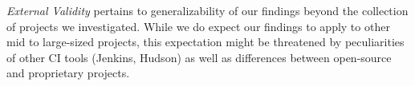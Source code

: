 \smallskip \emph{External Validity} pertains to generalizability of our findings 
beyond the collection of \GH projects we investigated.
While we do expect our findings to apply to other mid to large-sized projects,
this expectation might be threatened by peculiarities of other CI tools (\eg Jenkins, 
Hudson) as well as differences between open-source and proprietary projects.

